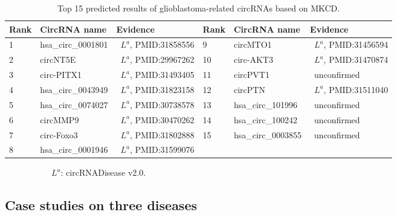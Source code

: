 \documentclass[journal,twoside,web]{ieeecolor}
\begin{document}
\begin{table}[!t]
	\centering
	\renewcommand{\arraystretch}{1.2}
	\begin{threeparttable}[b]
        \caption{Top 15 predicted results of glioblastoma-related circRNAs based on MKCD.}	\label{tab:tab4}
        \label{tab:05}
		\begin{tabular}{p{1cm}<{\centering}  p{2.2cm}<{\centering} p{3.5cm}<{\centering} | p{1cm}<{\centering} p{2.2cm}<{\centering} p{3.5cm}<{\centering}}
            \hline
            Rank & CircRNA name & Evidence & Rank &	CircRNA name & Evidence \\
            \hline
            1 & hsa\_circ\_0001801 & \ $L^a$, PMID:31858556 & 9 & circMTO1 & \ $L^a$, PMID:31456594 \\
            2 & circNT5E & \ $L^a$, PMID:29967262 & 10 & circ-AKT3 & \ $L^a$, PMID:31470874 \\
            3 & circ-PITX1 & \ $L^a$, PMID:31493405 & 11 & circPVT1 & \ unconfirmed \\
            4 & hsa\_circ\_0043949 & \ $L^a$, PMID:31823158 & 12 & circPTN & \ $L^a$, PMID:31511040 \\
            5 & hsa\_circ\_0074027 & \ $L^a$, PMID:30738578 & 13 & hsa\_circ\_101996 & \ unconfirmed \\
            6 & circMMP9 & \ $L^a$, PMID:30470262 & 14 & hsa\_circ\_100242 & \ unconfirmed \\
            7 & circ-Foxo3 & \ $L^a$, PMID:31802888 & 15 & hsa\_circ\_0003855 & \ unconfirmed \\
            8 & hsa\_circ\_0001946 & \ $L^a$, PMID:31599076 & & & \\
             \hline
		\end{tabular}
	\end{threeparttable}
    \begin{flushleft}
        \ \ \ \ \ \ \ \ \ \ \ $L^a$: circRNADisease v2.0.
    \end{flushleft}
    \vspace{-0.4cm}
\end{table}

\subsection{Case studies on three diseases}
\end{document}
